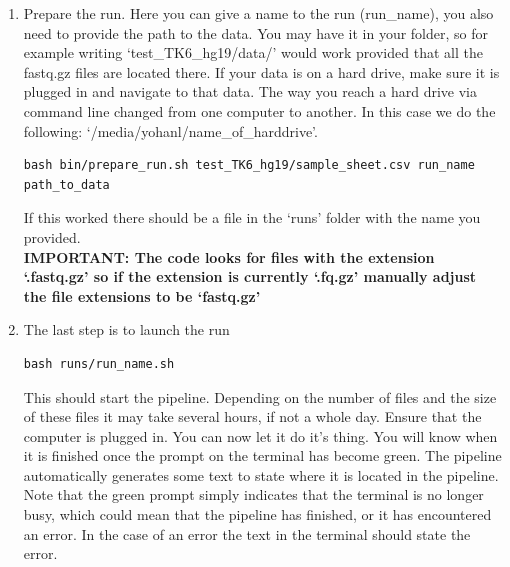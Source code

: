 \begin{enumerate}
\item Prepare the run. Here you can give a name to the run (run\_name), you also need to provide the path to the data. You may have it in your folder, so for example writing `test\_TK6\_hg19/data/' would work provided that all the fastq.gz files are located there. If your data is on a hard drive, make sure it is plugged in and navigate to that data. The way you reach a hard drive via command line changed from one computer to another. In this case we do the following: `/media/yohanl/name\_of\_harddrive'.
\begin{lstlisting}
bash bin/prepare_run.sh test_TK6_hg19/sample_sheet.csv run_name path_to_data
\end{lstlisting}
If this worked there should be a file in the `runs' folder with the name you provided.\\
\textbf{IMPORTANT: The code looks for files with the extension `.fastq.gz' so if the extension is currently `.fq.gz' manually adjust the file extensions to be `fastq.gz'}
\item The last step is to launch the run
\begin{lstlisting}
bash runs/run_name.sh
\end{lstlisting}
This should start the pipeline. Depending on the number of files and the size of these files it may take several hours, if not a whole day. Ensure that the computer is plugged in. You can now let it do it's thing. You will know when it is finished once the prompt on the terminal has become green. The pipeline automatically generates some text to state where it is located in the pipeline. Note that the green prompt simply indicates that the terminal is no longer busy, which could mean that the pipeline has finished, or it has encountered an error. In the case of an error the text in the terminal should state the error. 
\end{enumerate}

